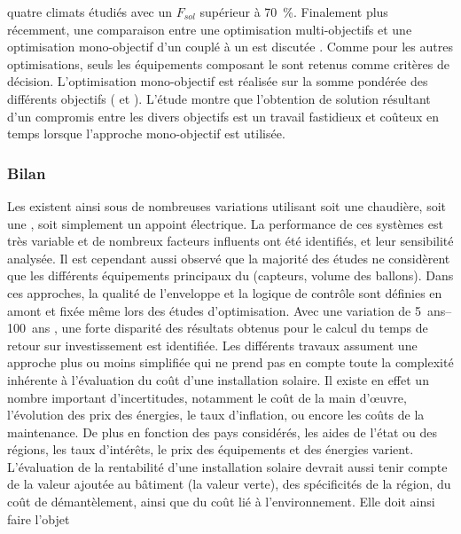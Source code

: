 quatre climats étudiés avec un $F_{sol}$ supérieur à \SI{70}{\percent}. Finalement
plus récemment, une comparaison entre une optimisation multi-objectifs et une optimisation
mono-objectif d’un  couplé à un  est discutée
\parencite{Rey2016622}. Comme pour les autres optimisations, seuls les équipements
composant le  sont retenus comme critères de décision. L’optimisation
mono-objectif est réalisée sur la somme pondérée des différents objectifs (
et ). L’étude montre que l’obtention de solution résultant d’un compromis entre
les divers objectifs est un travail fastidieux et coûteux en temps lorsque l’approche
mono-objectif est utilisée.


\subsubsection{Bilan} %
\label{ssub:bilan_travaux}
Les  existent ainsi sous de nombreuses variations utilisant soit une chaudière,
soit une , soit simplement un appoint électrique. La performance de ces systèmes
est très variable et de nombreux facteurs influents ont été identifiés, et leur
sensibilité analysée. Il est cependant aussi observé que la majorité des études ne
considèrent que les différents équipements principaux du  (capteurs, volume des
ballons). Dans ces approches, la qualité de l’enveloppe et la logique de contrôle sont
définies en amont et fixée même lors des études d’optimisation. Avec une variation de \SIrange{5}{100}{ans}
\parencite{Tsalikis2015743,Hin2014102}, une forte disparité des résultats obtenus pour le
calcul du temps de retour sur investissement est identifiée. Les différents travaux
assument une approche plus ou moins simplifiée qui ne prend pas en compte toute
la complexité inhérente à l’évaluation du coût d’une installation solaire. Il existe en
effet un nombre important d’incertitudes, notamment le coût de la main
d’œuvre, l’évolution des prix des énergies, le taux d’inflation, ou encore les coûts de la
maintenance. De plus en fonction des pays considérés, les aides de l’état ou des régions,
les taux d’intérêts, le prix des équipements et des énergies varient. L’évaluation de la
rentabilité d’une installation solaire devrait aussi tenir compte de la valeur ajoutée au
bâtiment (la valeur verte), des spécificités de la région, du coût de démantèlement, ainsi
que du coût lié à l’environnement. Elle doit ainsi faire l’objet
